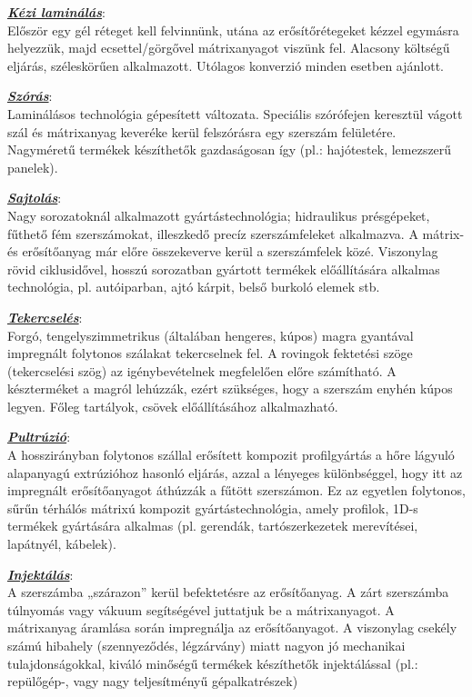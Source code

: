 \documentclass[12pt,a4paper]{article}       %
\newcounter{questionctr}
\newenvironment{question}[1]{
  \refstepcounter{questionctr}
  \begin{tcolorbox}[
    colback=gray!25,
    colbacktitle=red!10!yellow!50,
    enhanced,
    sharp corners,
    boxrule=0mm,
    frame hidden,
    breakable,
    enhanced jigsaw,
    title={\textcolor{black}{\textsc{\# \thequestionctr{} – #1}}}
  ]


}{\end{tcolorbox}}
\begin{document}
\begin{question}{
    Mutassa be a hőre nem lágyuló mátrixú kompozitok jellemző
    gyártástechnológiáit.
  }
  \underline{\textbf{\textit{Kézi laminálás}}}: \\
  Először egy gél réteget kell felvinnünk, utána az erősítőrétegeket kézzel
  egymásra helyezzük, majd ecsettel/görgővel mátrixanyagot viszünk fel.
  Alacsony költségű eljárás, széleskörűen alkalmazott. Utólagos konverzió
  minden esetben ajánlott.
  \tcbline

  \underline{\textbf{\textit{Szórás}}}: \\
  Laminálásos technológia gépesített változata. Speciális szórófejen
  keresztül vágott szál és mátrixanyag keveréke kerül felszórásra egy szerszám
  felületére. Nagyméretű termékek készíthetők gazdaságosan így (pl.:
  hajótestek, lemezszerű panelek).
  \tcbline

  \underline{\textbf{\textit{Sajtolás}}}: \\
  Nagy sorozatoknál alkalmazott gyártástechnológia; hidraulikus présgépeket,
  fűthető fém szerszámokat, illeszkedő precíz szerszámfeleket alkalmazva. A
  mátrix- és erősítőanyag már előre összekeverve kerül a szerszámfelek közé.
  Viszonylag rövid ciklusidővel, hosszú sorozatban gyártott termékek
  előállítására alkalmas technológia, pl. autóiparban, ajtó kárpit, belső
  burkoló
  elemek stb.
  \tcbline

  \underline{\textbf{\textit{Tekercselés}}}: \\
  Forgó, tengelyszimmetrikus (általában hengeres, kúpos) magra gyantával
  impregnált folytonos szálakat tekercselnek fel. A rovingok fektetési szöge
  (tekercselési szög) az igénybevételnek megfelelően előre számítható. A
  készterméket a magról lehúzzák, ezért szükséges, hogy a szerszám enyhén kúpos
  legyen. Főleg tartályok, csövek előállításához alkalmazható.
  \tcbline

  \underline{\textbf{\textit{Pultrúzió}}}: \\
  A hosszirányban folytonos szállal erősített kompozit profilgyártás a hőre
  lágyuló alapanyagú extrúzióhoz hasonló eljárás, azzal a lényeges
  különbséggel, hogy itt az impregnált erősítőanyagot áthúzzák a fűtött
  szerszámon. Ez az egyetlen folytonos, sűrűn térhálós mátrixú kompozit
  gyártástechnológia, amely profilok, 1D-s termékek gyártására alkalmas (pl.
  gerendák, tartószerkezetek merevítései, lapátnyél, kábelek).
  \tcbline

  \underline{\textbf{\textit{Injektálás}}}: \\
  A szerszámba „szárazon” kerül befektetésre az erősítőanyag. A zárt szerszámba
  túlnyomás vagy vákuum segítségével juttatjuk be a mátrixanyagot. A
  mátrixanyag áramlása során impregnálja az erősítőanyagot. A viszonylag
  csekély számú hibahely (szennyeződés, légzárvány) miatt nagyon jó mechanikai
  tulajdonságokkal, kiváló minőségű termékek készíthetők injektálással (pl.:
  repülőgép-, vagy nagy teljesítményű gépalkatrészek)
  \tcbline


\end{question}
\end{document}
